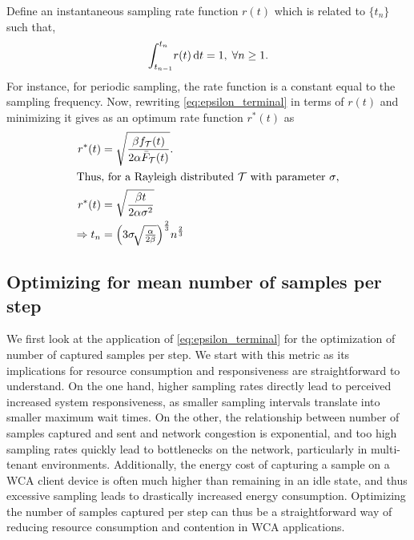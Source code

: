 Define an instantaneous sampling rate function $r(t)$ which is related to $\{t_n\}$ such that,
\begin{alignat}{1}
{\int_{t_{n-1}}^{t_n}}r(t)\,\mathrm{d} t=1,\;\forall n\geq1.\label{rt}
\end{alignat}
For instance, for periodic sampling, the rate function is a constant equal to the sampling frequency. 
Now, rewriting \cref{eq:epsilon_terminal} in terms of $r(t)$ and minimizing it gives as an optimum rate function $r^*(t)$ as
\begin{alignat}{1}
r^*(t)&=\sqrt{\dfrac{\beta f_\mathcal{T}(t)}{2\alpha\bar{F}_\mathcal{T}(t)}}.\nonumber\\
\intertext{Thus, for a Rayleigh distributed $\mathcal{T}$ with parameter $\sigma$,}
r^*(t)&=\sqrt{\dfrac{\beta t}{2\alpha\sigma^2}}\nonumber\\
\Rightarrow t_n&=\Big(3\sigma\!\sqrt{\tfrac{\alpha}{2\beta}}\Big)^{\frac{2}{3}}n^{\frac{2}{3}}\label{tn_approx_rayleigh}
\end{alignat}


\subsection{Optimizing for mean number of samples per step}\label{ssec:optimization:samples}

We first look at the application of \cref{eq:epsilon_terminal} for the optimization of number of captured samples per step.
We start with this metric as its implications for resource consumption and responsiveness are straightforward to understand.
On the one hand, higher sampling rates directly lead to perceived increased system responsiveness, as smaller sampling intervals translate into smaller maximum wait times.
On the other, the relationship between number of samples captured and sent and network congestion is exponential, and too high sampling rates quickly lead to bottlenecks on the network, particularly in multi-tenant environments.
Additionally, the energy cost of capturing a sample on a \ac{WCA} client device is often much higher than remaining in an idle state, and thus excessive sampling leads to drastically increased energy consumption.
Optimizing the number of samples captured per step can thus be a straightforward way of reducing resource consumption and contention in \ac{WCA} applications.

